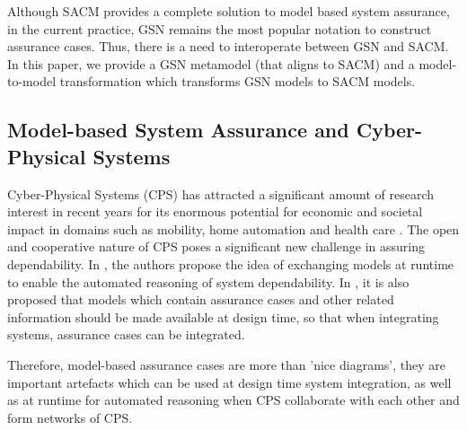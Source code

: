 Although SACM provides a complete solution to model based system assurance, in the current practice, GSN remains the most popular notation to construct assurance cases. Thus, there is a need to interoperate between GSN and SACM. In this paper, we provide a GSN metamodel (that aligns to SACM) and a model-to-model transformation which transforms GSN models to SACM models. 

\subsection{Model-based System Assurance and Cyber-Physical Systems}
Cyber-Physical Systems (CPS) has attracted a significant amount of research interest in recent years for its enormous potential for economic and societal impact in domains such as mobility, home automation and health care \cite{}. The open and cooperative nature of CPS poses a significant new challenge in assuring dependability. In \cite{}, the authors propose the idea of exchanging models at runtime to enable the automated reasoning of system dependability. In \cite{}, it is also proposed that models which contain assurance cases and other related information should be made available at design time, so that when integrating systems, assurance cases can be integrated. 

Therefore, model-based assurance cases are more than 'nice diagrams', they are important artefacts which can be used at design time system integration, as well as at runtime for automated reasoning when CPS collaborate with each other and form networks of CPS. 


